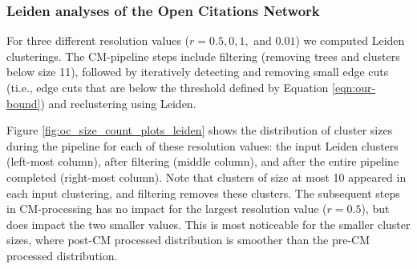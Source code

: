 \documentclass[11pt]{article}   	%
\begin{document}
\subsubsection{Leiden analyses of the Open Citations Network}
For three different resolution values ($r=0.5, 0,1,$ and $0.01$) we computed Leiden clusterings. 
The CM-pipeline steps include filtering (removing trees and clusters below size 11), followed by iteratively detecting and removing small edge cuts (ti.e., edge cuts that are below the threshold
defined by Equation \ref{eqn:our-bound}) and reclustering using Leiden. 


Figure \ref{fig:oc_size_count_plots_leiden} shows the distribution of cluster sizes during the pipeline for each of these resolution values:  the input Leiden clusters (left-most column), after filtering (middle column), and after the entire pipeline completed  (right-most column). 
Note that clusters of size at most 10 appeared in each input clustering, and filtering removes these clusters.
The subsequent steps in CM-processing  has no impact for the largest resolution value ($r=0.5$), but does impact the two smaller values. This is most noticeable for the smaller cluster sizes, where post-CM processed distribution is smoother than the pre-CM processed distribution.




\end{document}
